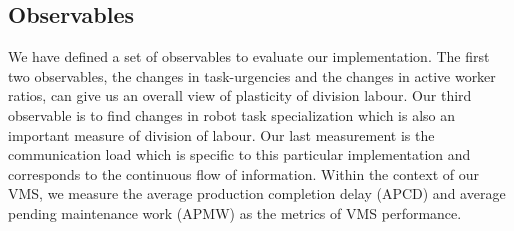 \documentclass{llncs}
\begin{document}
\subsection{Observables}
We have defined a set of observables to evaluate our implementation. The first two observables, the changes in task-urgencies and the changes in active worker ratios, can give us an overall view of plasticity of division labour. Our third observable is to find changes in robot task specialization which is also an important measure of division of labour. Our last measurement is the communication load which is specific to this particular implementation and corresponds to the continuous flow of information. Within the context of our VMS, we measure the average production completion delay (APCD) and average pending maintenance work (APMW) as the metrics of VMS performance.
% 
\end{document}
